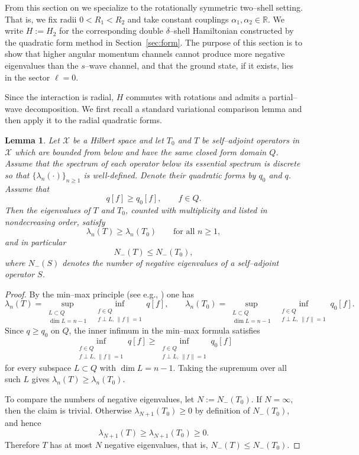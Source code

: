 \documentclass[a4paper,11pt]{article}
\numberwithin{equation}{section}
\newtheorem{lem}[thm]{Lemma}
\theoremstyle{definition}
\theoremstyle{remark}
\begin{document}
From this section on we specialize to the rotationally symmetric two--shell
setting.
That is, we fix radii $0<R_1<R_2$ and take constant couplings
$\alpha_1,\alpha_2\in\mathbb R$.
We write $H:=H_2$ for the corresponding double $\delta$--shell Hamiltonian
constructed by the quadratic form method in Section~\ref{sec:form}.
The purpose of this section is to show that higher angular momentum channels
cannot produce more negative eigenvalues than the $s$--wave channel, and that
the ground state, if it exists, lies in the sector $\ell=0$.

Since the interaction is radial, $H$ commutes with rotations and admits a
partial--wave decomposition.
We first recall a standard variational comparison lemma and then apply it to
the radial quadratic forms.

\begin{lem}\label{lem:neg-eig-monotone}
Let $\mathcal X$ be a Hilbert space and let $T_0$ and $T$ be self--adjoint
operators in $\mathcal X$ which are bounded from below and have the same
closed form domain $Q$.
Assume that the spectrum of each operator below its essential spectrum is
discrete so that $\{\lambda_n(\cdot)\}_{n\ge1}$ is well-defined.
Denote their quadratic forms by $q_0$ and $q$.
Assume that
\[
q[f]\ge q_0[f],\qquad f\in Q.
\]
Then the eigenvalues of $T$ and $T_0$, counted with multiplicity and listed in
nondecreasing order, satisfy
\[
\lambda_n(T)\ge \lambda_n(T_0)\qquad\text{for all }n\ge1,
\]
and in particular
\[
N_-(T)\le N_-(T_0),
\]
where $N_-(S)$ denotes the number of negative eigenvalues of a self--adjoint
operator $S$.
\end{lem}

\begin{proof}
By the min--max principle (see e.g., \cite{KatoBook})
one has
\[
\lambda_n(T)
=
\sup_{\substack{L\subset Q\\ \dim L = n-1}}
\ \inf_{\substack{f\in Q\\ f\perp L,\,\|f\|=1}} q[f],
\qquad
\lambda_n(T_0)
=
\sup_{\substack{L\subset Q\\ \dim L = n-1}}
\ \inf_{\substack{f\in Q\\ f\perp L,\,\|f\|=1}} q_0[f].
\]
Since $q\ge q_0$ on $Q$, the inner infimum in the min--max formula satisfies
\[
\inf_{\substack{f\in Q\\ f\perp L,\,\|f\|=1}} q[f]
\ge
\inf_{\substack{f\in Q\\ f\perp L,\,\|f\|=1}} q_0[f]
\]
for every subspace $L\subset Q$ with $\dim L=n-1$.
Taking the supremum over all such $L$ gives $\lambda_n(T)\ge\lambda_n(T_0)$.

To compare the numbers of negative eigenvalues, let $N:=N_-(T_0)$.
If $N=\infty$, then the claim is trivial. Otherwise $\lambda_{N+1}(T_0)\ge 0$
by definition of $N_-(T_0)$, and hence
\[
\lambda_{N+1}(T)\ge \lambda_{N+1}(T_0)\ge 0.
\]
Therefore $T$ has at most $N$ negative eigenvalues, that is, $N_-(T)\le N_-(T_0)$.
\end{proof}
\end{document}
